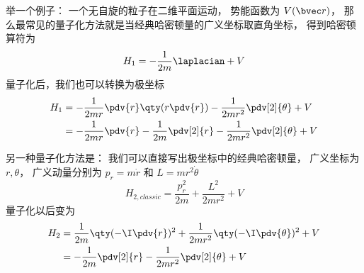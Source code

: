 
举一个例子： 一个无自旋的粒子在二维平面运动， 势能函数为 $V(\bvec r)$， 那么最常见的量子化方法就是当经典哈密顿量的广义坐标取直角坐标， 得到哈密顿算符为
\begin{equation}
H_1 = -\frac{1}{2m} \laplacian + V
\end{equation}
量子化后，我们也可以转换为极坐标
\begin{equation}
\begin{aligned}
H_1 &= -\frac{1}{2mr}\pdv{r}\qty(r \pdv{r}) - \frac{1}{2mr^2} \pdv[2]{\theta} + V\\
&= -\frac{1}{2mr}\pdv{r} -\frac{1}{2m}\pdv[2]{r} - \frac{1}{2mr^2} \pdv[2]{\theta} + V
\end{aligned}
\end{equation}

另一种量子化方法是： 我们可以直接写出极坐标中的经典哈密顿量， 广义坐标为 $r, \theta$， 广义动量分别为 $p_r = m\dot r$ 和 $L = mr^2\dot\theta$
\begin{equation}
H_{2,classic} = \frac{p_r^2}{2m} + \frac{L^2}{2mr^2} + V
\end{equation}
量子化以后变为
\begin{equation}
\begin{aligned}
H_2 &= \frac{1}{2m}\qty(-\I\pdv{r})^2 + \frac{1}{2mr^2}\qty(-\I\pdv{\theta})^2 + V\\
&= -\frac{1}{2m}\pdv[2]{r} - \frac{1}{2mr^2} \pdv[2]{\theta} + V
\end{aligned}
\end{equation}
